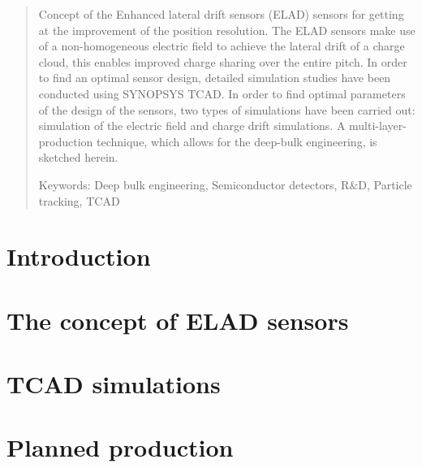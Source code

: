 \documentclass[a4paper,10pt]{article}
\newcommand*{\notFOREPJ}{}%
\begin{document}
\begin{abstract}
\noindent

Concept of the Enhanced lateral drift sensors (ELAD) sensors for getting at the improvement of the position resolution. 
The ELAD sensors make use of a non-homogeneous electric field to achieve the lateral drift of a charge cloud, this enables improved charge sharing over the entire pitch. 
In order to find an optimal sensor design, detailed simulation studies have been conducted using SYNOPSYS TCAD.
In order to find optimal parameters of the design of the sensors,  two types of simulations have been carried out: simulation of the electric field and charge drift simulations. 
A multi-layer-production technique, which allows for the deep-bulk engineering, is sketched herein.  

\noindent
Keywords: Deep bulk engineering, Semiconductor detectors, R$\&$D, Particle tracking, TCAD %

\end{abstract}


\section{Introduction}
\label{sec:intro}
\ifdefined\notFOREPJ

\else
 
\fi
% 
%  
%  

\section{The concept of ELAD sensors}
\label{sec:concept}
\ifdefined\notFOREPJ

\else
 
\fi

\section{TCAD simulations}
\label{sec:simulations}
\ifdefined\notFOREPJ
 
\else
 
\fi


\section{Planned production}
\label{sec:production}
\ifdefined\notFOREPJ
 
\else
 
\fi
\end{document}
